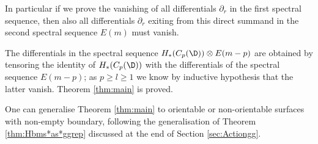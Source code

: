 In particular if we prove the vanishing of all differentials $\partial_r$
in the first spectral sequence, then also all differentials
$\partial_r$ exiting from this direct summand in the
second spectral sequence $E(m)$ must vanish.

The differentials in the spectral sequence $H_*(C_p(\D))\otimes E(m-p)$
are obtained by tensoring the identity of $H_*(C_p(\D))$ with the differentials
of the spectral sequence $E(m-p)$; as $p\geq l\geq 1$ we know by inductive hypothesis
that the latter vanish. Theorem \ref{thm:main} is proved.

One can generalise Theorem \ref{thm:main} to orientable or non-orientable
surfaces with non-empty boundary, following the generalisation
of Theorem \ref{thm:Hbms*as*ggrep} discussed at the end of Section \ref{sec:Actiongg}.